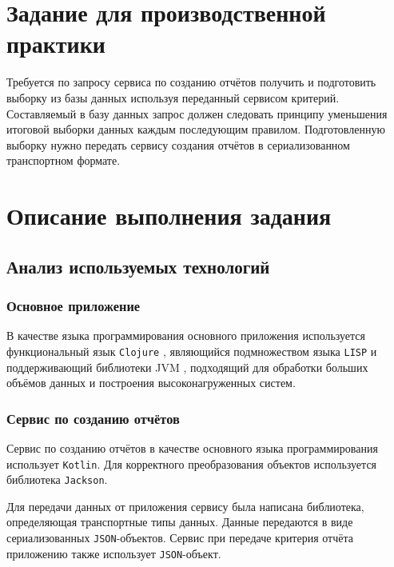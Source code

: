 \clearpage

\section{Задание для производственной практики}

Требуется по запросу сервиса по созданию отчётов получить и подготовить выборку из базы данных используя переданный сервисом критерий. Составляемый в базу данных запрос должен следовать принципу уменьшения итоговой выборки данных каждым последующим правилом. Подготовленную выборку нужно передать сервису создания отчётов в сериализованном транспортном \cite{DTO} формате.

\clearpage

\section{Описание выполнения задания}

\subsection{Анализ используемых технологий}

\subsubsection{Основное приложение}

В качестве языка программирования основного приложения используется функциональный язык \texttt{Clojure} \cite{clojure}, являющийся подмножеством языка \texttt{LISP} \cite{lisp} и поддерживающий библиотеки JVM \cite{jvm}, подходящий для обработки больших объёмов данных и построения высоконагруженных систем.

\subsubsection{Сервис по созданию отчётов}

Сервис по созданию отчётов в качестве основного языка программирования использует \texttt{Kotlin}\cite{kotlin}. Для корректного преобразования объектов используется библиотека \texttt{Jackson}\cite{jackson}.

Для передачи данных от приложения сервису была написана библиотека, определяющая транспортные типы данных. Данные передаются в виде сериализованных \texttt{JSON}-объектов\cite{JSON}. Сервис при передаче критерия отчёта приложению также использует \texttt{JSON}-объект.

